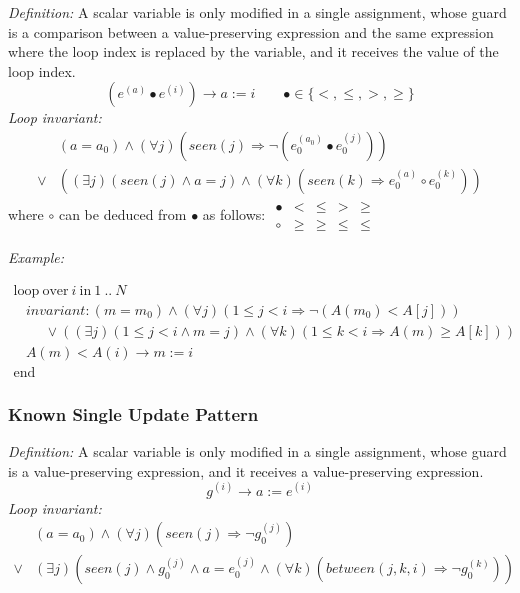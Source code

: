 \documentclass[a4paper,10pt]{article}
\newcommand{\idx}{\ensuremath{i}\xspace}
\newcommand{\at}[1]{{(#1)}}
\newcommand{\KWloop}{\ensuremath{\mathrm{loop}~}}
\newcommand{\KWend}{\ensuremath{\mathrm{end}~}}
\newcommand{\KWover}{\ensuremath{\mathrm{over}~}}
\newcommand{\KWin}{\ensuremath{~\mathrm{in}~}}
\newcommand{\impl}{\ensuremath{\Longrightarrow}}
\newcommand{\seen}[1]{\ensuremath{\mathit{seen}(#1)}\xspace}
\newcommand{\between}[3]{\ensuremath{\mathit{between}{(#1,#2,#3)}}\xspace}
\newcommand{\loopinvariant}{\noindent\textit{Loop invariant:}\xspace}
\newcommand{\patterndef}{\noindent\textit{Definition:}\xspace}
\newcommand{\patternexample}{\noindent\textit{Example:}\xspace}
\begin{document}
\patterndef A scalar variable is only modified in a single assignment, whose
guard is a comparison between a value-preserving expression and the same expression
where the loop index is replaced by the variable, and it receives the value of
the loop index.
%
$$(e^\at{a} \bullet e^\at{\idx}) \rightarrow a := \idx  \qquad \bullet \in \{<, \leq, >, \geq \}$$
%
\loopinvariant
%
\begin{eqnarray*}
&(a = a_0) \land (\forall j)(\seen{j} \impl \neg (e_0^\at{a_0} \bullet e_0^\at{j}))\\
\lor 
& ((\exists j)(\seen{j} \land a = j) \land (\forall k)(\seen{k} \impl e_0^\at{a} \circ e_0^\at{k}))
\end{eqnarray*}
where $\circ$ can be deduced from $\bullet$ as follows:
$\begin{array}{l|llll}
\bullet & <    & \leq & >    & \geq \\ \hline
\circ   & \geq & \geq & \leq & \leq
\end{array}$

\bigskip
\patternexample

\medskip
$\begin{array}{l}
  \KWloop \KWover i \KWin 1~..~N \\
  ~~~~ \textit{invariant}: (m = m_0) \land (\forall j)(1\leq j < i \impl \neg (A(m_0) < A[j]))\\
  ~~~~~~~~~~ \lor ((\exists j)(1\leq j < i \land m = j) \land (\forall k)(1\leq k < i \impl A(m) \geq A[k]))\\
  ~~~~ A(m) < A(i) \rightarrow m := i\\
  \KWend
\end{array}$

\subsubsection*{Known Single Update Pattern}

\patterndef A scalar variable is only modified in a single assignment, whose
guard is a value-preserving expression, and it receives a value-preserving expression.
%
$$g^\at{\idx} \rightarrow a := e^\at{\idx}$$
%
\loopinvariant
%
\begin{eqnarray*}
&(a = a_0) \land (\forall j)(\seen{j} \impl \neg g_0^\at{j})\\
\lor 
& (\exists j)(\seen{j} \land g_0^\at{j} \land a = e_0^\at{j} \land (\forall k)(\between{j}{k}{\idx} \impl \neg g_0^\at{k}))
\end{eqnarray*}
\end{document}
